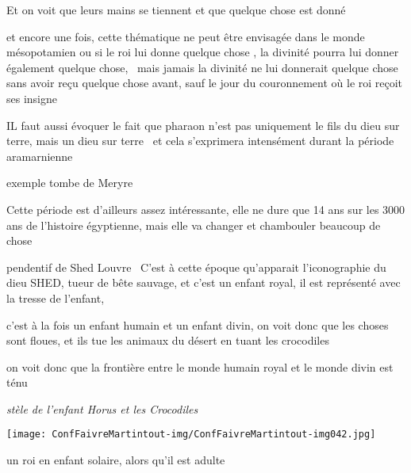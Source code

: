 \documentclass[a4paper]{article}
\begin{document}
\bigskip

{
Et on voit que leurs mains se tiennent et que quelque chose est donné}

{
et encore une fois, cette thématique ne peut être envisagée dans le
monde mésopotamien ou si le roi lui donne quelque chose , la divinité
pourra lui donner également quelque chose, \ mais jamais la divinité ne
lui donnerait quelque chose sans avoir reçu quelque chose avant, sauf
le jour du couronnement où le roi reçoit ses insigne}


\bigskip

{
IL faut aussi évoquer le fait que pharaon n'est pas uniquement le fils
du dieu sur terre, mais un dieu sur terre \ et cela s'exprimera
intensément durant la période aramarnienne }

{
exemple tombe de Meryre}

{
Cette période est d'ailleurs assez intéressante, elle ne dure que 14 ans
sur les 3000 ans de l'histoire égyptienne, mais elle va changer et
chambouler beaucoup de chose}


\bigskip


\bigskip

{
pendentif de Shed Louvre \ C'est à cette époque qu'apparait
l'iconographie du dieu SHED, tueur de bête sauvage, et c'est un enfant
royal, il est représenté avec la tresse de l'enfant, }

{
c'est à la fois un enfant humain et un enfant divin, on voit donc que
les choses sont floues, et ils tue les animaux du désert en tuant les
crocodiles}

{
on voit donc que la frontière entre le monde humain royal et le monde
divin est ténu}


\bigskip

{
\textit{stèle de l'enfant Horus et les Crocodiles}}


\bigskip


\texttt{[image: ConfFaivreMartintout-img/ConfFaivreMartintout-img042.jpg]}



\bigskip


\bigskip


\bigskip

{
un roi en enfant solaire, alors qu'il est adulte}
\end{document}
